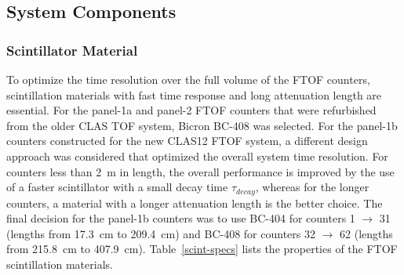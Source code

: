\documentclass{elsart}
\begin{document}
\subsection{System Components}

\subsubsection{Scintillator Material}

To optimize the time resolution over the full volume of the FTOF counters, scintillation materials with
fast time response and long attenuation length are essential. For the panel-1a and panel-2 FTOF counters
that were refurbished from the older CLAS TOF system, Bicron BC-408 was selected. For the panel-1b
counters constructed for the new CLAS12 FTOF system, a different design approach was considered
that optimized the overall system time resolution. For counters less than 2~m in length, the overall
performance is improved by the use of a faster scintillator with a small decay time $\tau_{decay}$, whereas
for the longer counters, a material with a longer attenuation length is the better choice. The final decision
for the panel-1b counters was to use BC-404 for counters 1 $\to$ 31 (lengths from 17.3~cm to 209.4~cm)
and BC-408 for counters 32 $\to$ 62 (lengths from 215.8~cm to 407.9~cm). Table~\ref{scint-specs}
lists the properties of the FTOF scintillation materials.
\end{document}
